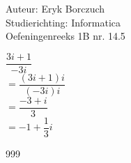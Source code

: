 \documentclass[a4paper]{article}
\begin{document}
  
\noindent \large Auteur: Eryk Borczuch \\
\noindent \large Studierichting: Informatica\\
\noindent \large Oefeningenreeks 1B nr. 14.5\\

\medskip

\normalsize

$\dfrac{3i+1}{-3i}$\\

$=\dfrac{(3i+1)i}{(-3i)i}$\\

$= \dfrac{-3+i}{3}$\\

$= -1+ \dfrac{1}{3}i$\\

\begin{thebibliography}{999}
\end{thebibliography}
\end{document}
